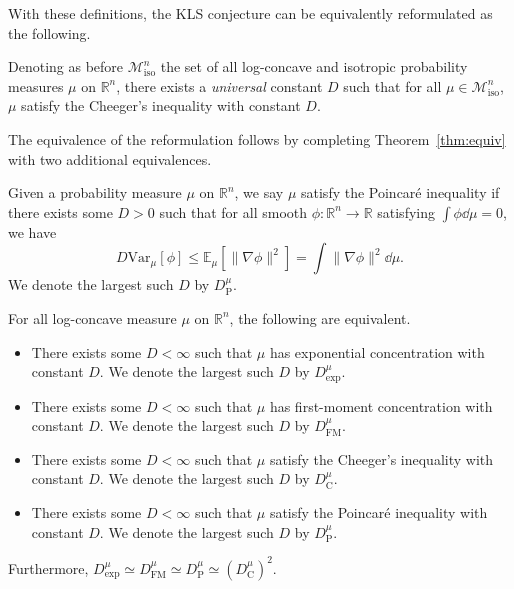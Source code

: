 With these definitions, the KLS conjecture can be equivalently reformulated as the following.

\begin{conjecture}
  Denoting as before \(\mathscr{M}^n_{\text{iso}}\) the set of all log-concave and isotropic probability measures \(\mu\) on 
  \(\mathbb{R}^n\), there exists a \textit{universal} constant \(D\) such that for all 
  \(\mu \in \mathscr{M}^n_{\text{iso}}\), \(\mu\) satisfy the Cheeger's inequality with constant \(D\).
\end{conjecture}

The equivalence of the reformulation follows by completing Theorem~\ref{thm:equiv} with two additional 
equivalences.

\begin{definition}
  Given a probability measure \(\mu\) on \(\mathbb{R}^n\), we say \(\mu\) satisfy the Poincaré inequality 
  if there exists some \(D > 0\) such that for all 
  smooth \(\phi : \mathbb{R}^n \to \mathbb{R}\) satisfying \(\int \phi \dd\mu = 0\), we have
  \[D \text{Var}_\mu[\phi] \le \mathbb{E}_\mu[\|\nabla \phi\|^2] = \int \|\nabla \phi\|^2 \dd\mu.\]
  We denote the largest such \(D\) by \(D^\mu_{\text{P}}\).
\end{definition}

\begin{theorem}\label{thm:milman2}
  For all log-concave measure \(\mu\) on \(\mathbb{R}^n\), the following are equivalent.
  \begin{itemize}
    \item There exists some \(D < \infty\) such that \(\mu\) has exponential concentration with constant \(D\). 
      We denote the largest such \(D\) by \(D^\mu_\text{exp}\).
    \item There exists some \(D < \infty\) such that \(\mu\) has first-moment concentration with constant \(D\). 
      We denote the largest such \(D\) by \(D^\mu_\text{FM}\).
    \item There exists some \(D < \infty\) such that \(\mu\) satisfy the Cheeger's inequality with constant \(D\).
      We denote the largest such \(D\) by \(D^\mu_\text{C}\).
    \item There exists some \(D < \infty\) such that \(\mu\) satisfy the Poincaré inequality with constant \(D\).
      We denote the largest such \(D\) by \(D^\mu_\text{P}\).
  \end{itemize}
  Furthermore, \(D^\mu_{\text{exp}} \simeq D^\mu_{\text{FM}} \simeq D^\mu_{\text{P}} \simeq (D^\mu_{\text{C}})^2\).
\end{theorem}

